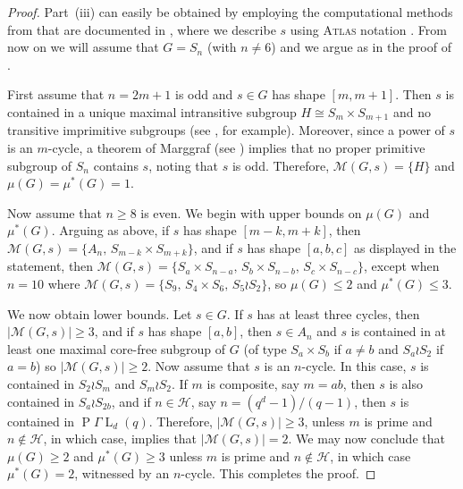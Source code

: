 \documentclass[11pt]{article}
\numberwithin{equation}{section}
\theoremstyle{shdefinition}
\theoremstyle{shplain}
\newcommand{\M}{\mathcal{M}}
\newcommand{\<}{\langle}
\renewcommand{\>}{\rangle}
\renewcommand{\leq}{\leqslant}
\renewcommand{\geq}{\geqslant}
\renewcommand{\:}{\colon}
\newcommand{\PGaL}{\operatorname{P}\!\Gamma\!\operatorname{L}}
\begin{document}
\begin{proof}
Part~(iii) can easily be obtained by employing the computational methods from \cite{ref:BurnessHarper19} that are documented in \cite{ref:BurnessHarper19Computations}, where we describe $s$ using \textsc{Atlas} notation \cite{ref:ATLAS}. From now on we will assume that $G = S_n$ (with $n \neq 6$) and we argue as in the proof of \cite[Theorem~3.1]{ref:BurnessHarper19}. 

First assume that $n = 2m+1$ is odd and $s \in G$ has shape $[m,m+1]$. Then $s$ is contained in a unique maximal intransitive subgroup $H \cong S_m \times S_{m+1}$ and no transitive imprimitive subgroups (see \cite[Lemma~3.4]{ref:BurnessHarper19}, for example). Moreover, since a power of $s$ is an $m$-cycle, a theorem of Marggraf (see \cite[Theorem~13.5]{ref:Wielandt64}) implies that no proper primitive subgroup of $S_n$ contains $s$, noting that $s$ is odd. Therefore, $\M(G,s) = \{ H \}$ and $\mu(G) = \mu^*(G) = 1$. 

Now assume that $n \geq 8$ is even. We begin with upper bounds on $\mu(G)$ and $\mu^*(G)$. Arguing as above, if $s$ has shape $[m-k,m+k]$, then $\M(G,s) = \{ A_n,\, S_{m-k} \times S_{m+k} \}$, and if $s$ has shape $[a,b,c]$ as displayed in the statement, then $\M(G,s) = \{ S_a \times S_{n-a},\, S_b \times S_{n-b},\, S_c \times S_{n-c} \}$, except when $n=10$ where $\M(G,s) = \{ S_9,\, S_4 \times S_6,\, S_5 \wr S_2 \}$, so $\mu(G) \leq 2$ and $\mu^*(G) \leq 3$. 

We now obtain lower bounds. Let $s \in G$. If $s$ has at least three cycles, then $|\M(G,s)| \geq 3$, and if $s$ has shape $[a,b]$, then $s \in A_n$ and $s$ is contained in at least one maximal core-free subgroup of $G$ (of type $S_a \times S_b$ if $a \neq b$ and $S_a \wr S_2$ if $a=b$) so $|\M(G,s)| \geq 2$. Now assume that $s$ is an $n$-cycle. In this case, $s$ is contained in $S_2 \wr S_m$ and $S_m \wr S_2$. If $m$ is composite, say $m=ab$, then $s$ is also contained in $S_a \wr S_{2b}$, and if $n \in  \mathcal{H}$, say $n=(q^d-1)/(q-1)$, then $s$ is contained in $\PGaL_d(q)$. Therefore, $|\M(G,s)| \geq 3$, unless $m$ is prime and $n \not\in \mathcal{H}$, in which case, \cite[Theorem~3]{ref:Jones02} implies that $|\M(G,s)| = 2$. We may now conclude that $\mu(G) \geq 2$ and $\mu^*(G) \geq 3$ unless $m$ is prime and $n \not\in \mathcal{H}$, in which case $\mu^*(G)=2$, witnessed by an $n$-cycle. This completes the proof.
\end{proof}
\end{document}
